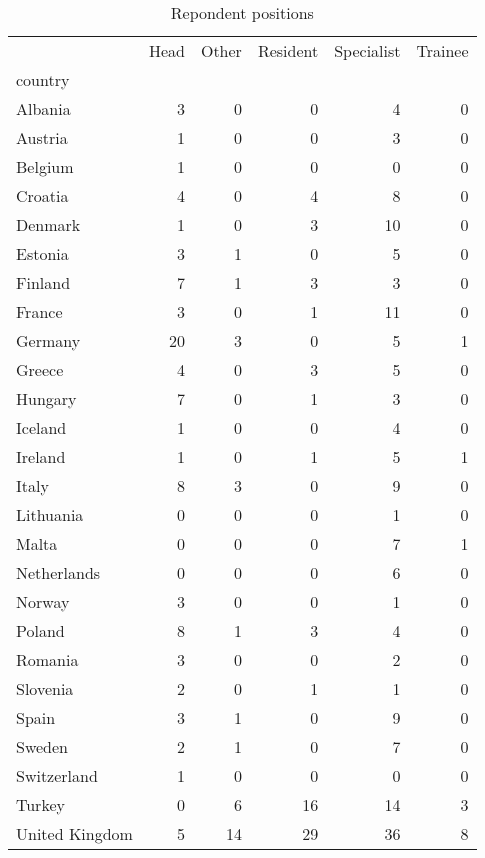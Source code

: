 \begin{table}[h]
\caption{Repondent positions}
\label{tab:respondents}
\begin{tabular}{lrrrrr}
\toprule
 & Head & Other & Resident & Specialist & Trainee \\
country &  &  &  &  &  \\
\midrule
Albania & 3 & 0 & 0 & 4 & 0 \\
Austria & 1 & 0 & 0 & 3 & 0 \\
Belgium & 1 & 0 & 0 & 0 & 0 \\
Croatia & 4 & 0 & 4 & 8 & 0 \\
Denmark & 1 & 0 & 3 & 10 & 0 \\
Estonia & 3 & 1 & 0 & 5 & 0 \\
Finland & 7 & 1 & 3 & 3 & 0 \\
France & 3 & 0 & 1 & 11 & 0 \\
Germany & 20 & 3 & 0 & 5 & 1 \\
Greece & 4 & 0 & 3 & 5 & 0 \\
Hungary & 7 & 0 & 1 & 3 & 0 \\
Iceland & 1 & 0 & 0 & 4 & 0 \\
Ireland & 1 & 0 & 1 & 5 & 1 \\
Italy & 8 & 3 & 0 & 9 & 0 \\
Lithuania & 0 & 0 & 0 & 1 & 0 \\
Malta & 0 & 0 & 0 & 7 & 1 \\
Netherlands & 0 & 0 & 0 & 6 & 0 \\
Norway & 3 & 0 & 0 & 1 & 0 \\
Poland & 8 & 1 & 3 & 4 & 0 \\
Romania & 3 & 0 & 0 & 2 & 0 \\
Slovenia & 2 & 0 & 1 & 1 & 0 \\
Spain & 3 & 1 & 0 & 9 & 0 \\
Sweden & 2 & 1 & 0 & 7 & 0 \\
Switzerland & 1 & 0 & 0 & 0 & 0 \\
Turkey & 0 & 6 & 16 & 14 & 3 \\
United Kingdom & 5 & 14 & 29 & 36 & 8 \\
\bottomrule
\end{tabular}
\end{table}
